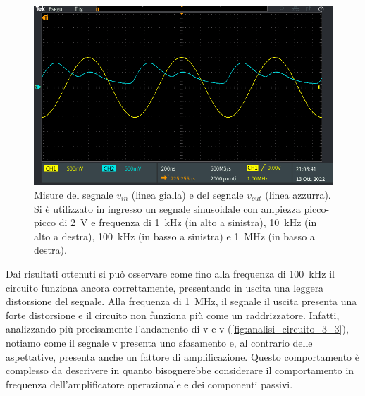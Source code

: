 \begin{figure}[!h]
\begin{minipage}{.496\textwidth}
	\end{minipage}
	\begin{minipage}{.496\textwidth}
		\includegraphics[width=\linewidth]{./ImageFiles/Laboratorio 2/TEK00048.PNG}
	\end{minipage}
	\caption{Misure del segnale $v_{in}$ (linea gialla) e del segnale $v_{out}$ (linea azzurra). Si è utilizzato in ingresso un segnale sinusoidale con ampiezza picco-picco di \SI{2}{\volt} e frequenza di \SI{1}{\kilo\hertz} (in alto a sinistra), \SI{10}{\kilo\hertz} (in alto a destra), \SI{100}{\kilo\hertz} (in basso a sinistra) e \SI{1}{\mega\hertz} (in basso a destra).}
	\label{fig:analisi_circuito_3_freq}
\end{figure}
Dai risultati ottenuti si può osservare come fino alla frequenza di \SI{100}{\kilo\hertz} il circuito funziona ancora correttamente, presentando in uscita una leggera distorsione del segnale. Alla frequenza di \SI{1}{\mega\hertz}, il segnale il uscita presenta una forte distorsione e il circuito non funziona più come un raddrizzatore. Infatti, analizzando più precisamente l'andamento di v e v (\Fig\ref{fig:analisi_circuito_3_3}), notiamo come il segnale v presenta uno sfasamento e, al contrario delle aspettative, presenta anche un fattore di amplificazione. Questo comportamento è complesso da descrivere in quanto bisognerebbe considerare il comportamento in frequenza dell'amplificatore operazionale e dei componenti passivi.

